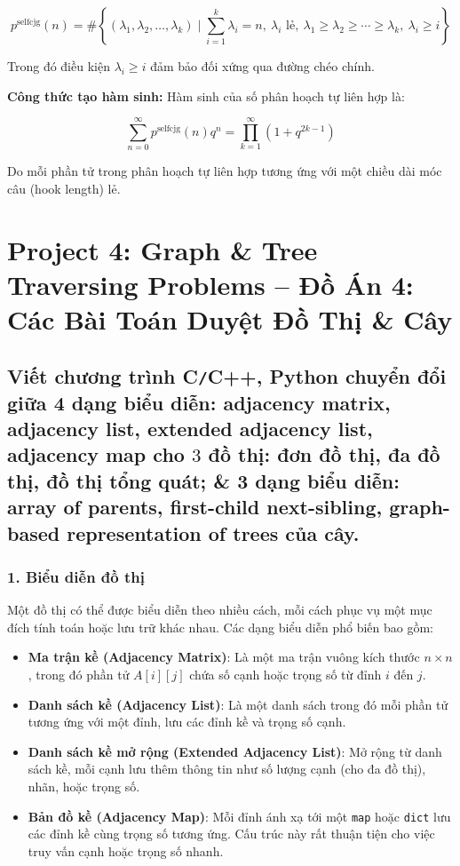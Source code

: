 \documentclass{article}
\begin{document}
\begin{itemize}
		\[
		p^{\text{selfcjg}}(n) = \# \left\{ (\lambda_1, \lambda_2, \dots, \lambda_k) \mid \sum_{i=1}^k \lambda_i = n,\ \lambda_i \text{ lẻ},\ \lambda_1 \geq \lambda_2 \geq \cdots \geq \lambda_k,\ \lambda_i \geq i \right\}
		\]
		
		Trong đó điều kiện \( \lambda_i \geq i \) đảm bảo đối xứng qua đường chéo chính.
		
		\textbf{Công thức tạo hàm sinh:} Hàm sinh của số phân hoạch tự liên hợp là:
		
		\[
		\sum_{n=0}^\infty p^{\text{selfcjg}}(n) q^n = \prod_{k=1}^\infty (1 + q^{2k-1})
		\]
		
		Do mỗi phần tử trong phân hoạch tự liên hợp tương ứng với một chiều dài móc câu (hook length) lẻ.
		
		
	\end{itemize}
	
	\section*{Project 4: Graph \& Tree Traversing Problems -- Đồ Án 4: Các Bài Toán Duyệt Đồ Thị \& Cây}
	
	\subsection*{Viết chương trình {\sf C{\tt/}C++, Python} chuyển đổi giữa 4 dạng biểu diễn: adjacency matrix, adjacency list, extended adjacency list, adjacency map cho $3$ đồ thị: đơn đồ thị, đa đồ thị, đồ thị tổng quát; \& 3 dạng biểu diễn: array of parents, first-child next-sibling, graph-based representation of trees của cây.}
	
	\subsubsection*{1. Biểu diễn đồ thị}
	
	Một đồ thị có thể được biểu diễn theo nhiều cách, mỗi cách phục vụ một mục đích tính toán hoặc lưu trữ khác nhau. Các dạng biểu diễn phổ biến bao gồm:
	
	\begin{itemize}
		\item \textbf{Ma trận kề (Adjacency Matrix)}: Là một ma trận vuông kích thước $n \times n$, trong đó phần tử $A[i][j]$ chứa số cạnh hoặc trọng số từ đỉnh $i$ đến $j$.
		\item \textbf{Danh sách kề (Adjacency List)}: Là một danh sách trong đó mỗi phần tử tương ứng với một đỉnh, lưu các đỉnh kề và trọng số cạnh.
		\item \textbf{Danh sách kề mở rộng (Extended Adjacency List)}: Mở rộng từ danh sách kề, mỗi cạnh lưu thêm thông tin như số lượng cạnh (cho đa đồ thị), nhãn, hoặc trọng số.
		\item \textbf{Bản đồ kề (Adjacency Map)}: Mỗi đỉnh ánh xạ tới một \texttt{map} hoặc \texttt{dict} lưu các đỉnh kề cùng trọng số tương ứng. Cấu trúc này rất thuận tiện cho việc truy vấn cạnh hoặc trọng số nhanh.
	\end{itemize}
\end{document}
